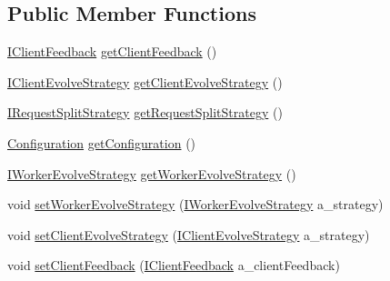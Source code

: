 \subsection*{Public Member Functions}
\begin{DoxyCompactItemize}
\item 
\hyperlink{interfaceorg_1_1jgap_1_1distr_1_1grid_1_1_i_client_feedback}{I\-Client\-Feedback} \hyperlink{interfaceorg_1_1jgap_1_1distr_1_1grid_1_1_i_grid_configuration_a77ff1414cdb515604e1e986eb40820b9}{get\-Client\-Feedback} ()
\item 
\hyperlink{interfaceorg_1_1jgap_1_1distr_1_1grid_1_1_i_client_evolve_strategy}{I\-Client\-Evolve\-Strategy} \hyperlink{interfaceorg_1_1jgap_1_1distr_1_1grid_1_1_i_grid_configuration_a804ce37551b1232bfe38d9da4f7f27b1}{get\-Client\-Evolve\-Strategy} ()
\item 
\hyperlink{interfaceorg_1_1jgap_1_1distr_1_1grid_1_1_i_request_split_strategy}{I\-Request\-Split\-Strategy} \hyperlink{interfaceorg_1_1jgap_1_1distr_1_1grid_1_1_i_grid_configuration_a3bc89bc6b3e62d7f046f8297250c0547}{get\-Request\-Split\-Strategy} ()
\item 
\hyperlink{classorg_1_1jgap_1_1_configuration}{Configuration} \hyperlink{interfaceorg_1_1jgap_1_1distr_1_1grid_1_1_i_grid_configuration_a979219f6d95a231b5b00ee927fb75292}{get\-Configuration} ()
\item 
\hyperlink{interfaceorg_1_1jgap_1_1distr_1_1grid_1_1_i_worker_evolve_strategy}{I\-Worker\-Evolve\-Strategy} \hyperlink{interfaceorg_1_1jgap_1_1distr_1_1grid_1_1_i_grid_configuration_a518772f9dd024dd1356b8fbf50164ac9}{get\-Worker\-Evolve\-Strategy} ()
\item 
void \hyperlink{interfaceorg_1_1jgap_1_1distr_1_1grid_1_1_i_grid_configuration_ac813b3b74095735b62fc943a92c5ed0c}{set\-Worker\-Evolve\-Strategy} (\hyperlink{interfaceorg_1_1jgap_1_1distr_1_1grid_1_1_i_worker_evolve_strategy}{I\-Worker\-Evolve\-Strategy} a\-\_\-strategy)
\item 
void \hyperlink{interfaceorg_1_1jgap_1_1distr_1_1grid_1_1_i_grid_configuration_aab6942c463260fd43491e337f93e5376}{set\-Client\-Evolve\-Strategy} (\hyperlink{interfaceorg_1_1jgap_1_1distr_1_1grid_1_1_i_client_evolve_strategy}{I\-Client\-Evolve\-Strategy} a\-\_\-strategy)
\item 
void \hyperlink{interfaceorg_1_1jgap_1_1distr_1_1grid_1_1_i_grid_configuration_a1d4add31a85b7f7434851e831ba7eccc}{set\-Client\-Feedback} (\hyperlink{interfaceorg_1_1jgap_1_1distr_1_1grid_1_1_i_client_feedback}{I\-Client\-Feedback} a\-\_\-client\-Feedback)

\end{DoxyCompactItemize}
